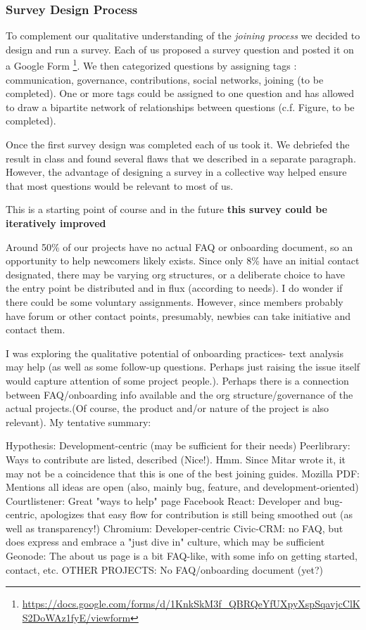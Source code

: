 \subsubsection{Survey Design Process}
To complement our qualitative understanding of the {\it joining process} we decided to design and run a survey. Each of us proposed a survey question and posted it on a Google Form \footnote{\url{https://docs.google.com/forms/d/1KnkSkM3f_QBRQeYfUXpyXspSqavjcClKS2DoWAz1fyE/viewform}}. We then categorized questions by assigning tags : communication, governance, contributions, social networks, joining (to be completed). One or more tags could be assigned to one question and has allowed to draw a bipartite network of relationships between questions (c.f. Figure, to be completed).

Once the first survey design was completed each of us took it. We debriefed the result in class and found several flaws that we described in a separate paragraph. However, the advantage of designing a survey in a collective way helped ensure that most questions would be relevant to most of us.

This is a starting point of course and in the future {\bf this survey could be iteratively improved}


Around 50\% of our projects have no actual FAQ or onboarding document, so an opportunity to help newcomers likely exists. Since only 8\% have an initial contact designated, there may be varying org structures, or a deliberate choice to have the entry point be distributed and in flux (according to needs). I do wonder if there could be some voluntary assignments. However, since members probably have forum or other contact points, presumably, newbies can take initiative and contact them.

I was exploring the qualitative potential of onboarding practices- text analysis may help (as well as some follow-up questions. Perhaps just raising the issue itself would capture attention of some project people.). Perhaps there is a connection between FAQ/onboarding info available and the org structure/governance of the actual projects.(Of course, the product and/or nature of the project is also relevant). My tentative summary:

Hypothesis: Development-centric (may be sufficient for their needs)
Peerlibrary: Ways to contribute are listed, described (Nice!). Hmm. Since Mitar wrote it, it may not be a coincidence that this is one of the best joining guides.
Mozilla PDF: Mentions all ideas are open (also, mainly bug, feature, and development-oriented)
Courtlistener: Great "ways to help" page
Facebook React: Developer and bug-centric, apologizes that easy flow for contribution is still being smoothed out (as well as transparency!)
Chromium: Developer-centric
Civic-CRM: no FAQ, but does express and embrace a  "just dive in" culture, which may be sufficient
Geonode: The about us page is a bit FAQ-like, with some info on getting started, contact, etc.
OTHER PROJECTS: No FAQ/onboarding document (yet?)


